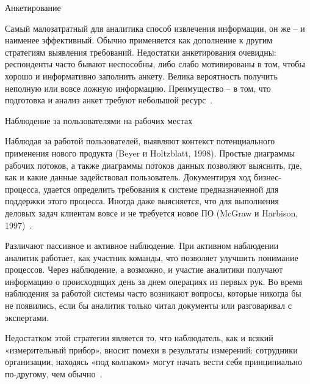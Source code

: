 \documentclass{../industrial-development}
\begin{document}
\alert{Анкетирование}

Самый малозатратный для аналитика способ извлечения информации, он же – и наименее эффективный. Обычно применяется как дополнение к другим стратегиям выявления требований.
Недостатки анкетирования очевидны: респонденты часто бывают неспособны, либо слабо мотивированы в том, чтобы хорошо и информативно заполнить анкету. Велика вероятность получить неполную или вовсе ложную информацию. Преимущество – в том, что подготовка и анализ анкет требуют небольшой ресурс~\cite[с.~32]{Maglinec}.

\alert{Наблюдение за пользователями на рабочих местах}

Наблюдая за работой пользователей, выявляют контекст потенциального применения нового продукта (Beyer и Holtzblatt, 1998). Простые диаграммы рабочих потоков, а также диаграммы потоков данных позволяют выяснить, где, как и какие данные задействовал пользователь. Документируя ход бизнес-процесса, удается определить требования к системе предназначенной для поддержки этого процесса. Иногда даже выясняется, что для выполнения деловых задач клиентам вовсе и не требуется новое ПО (McGraw и Harbison, 1997)~\cite[с.~47]{Wiegers}.

Различают пассивное и активное наблюдение. При активном наблюдении аналитик работает, как участник команды, что позволяет улучшить понимание процессов. Через наблюдение, а возможно, и участие аналитики получают информацию о происходящих день за днем операциях из первых рук. Во время наблюдения за работой системы часто возникают вопросы, которые никогда бы не появились, если бы аналитик только читал документы или разговаривал с экспертами.

Недостатком этой стратегии является то, что наблюдатель, как и всякий «измерительный прибор», вносит помехи в результаты измерений: сотрудники организации, находясь «под колпаком» могут начать вести себя принципиально по-другому, чем обычно~\cite[с.~32]{Maglinec}.
\end{document}
